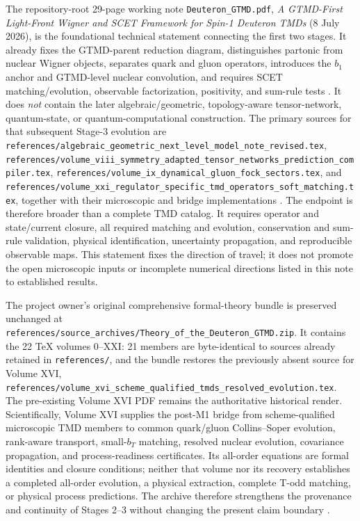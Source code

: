 \documentclass[11pt,oneside]{book}
\newcommand{\codepath}[1]{\nolinkurl{#1}}
\begin{document}
The repository-root 29-page working note \codepath{Deuteron_GTMD.pdf}, \emph{A GTMD-First Light-Front Wigner and SCET Framework for Spin-1 Deuteron TMDs} (8 July 2026), is the foundational technical statement connecting the first two stages.  It already fixes the GTMD-parent reduction diagram, distinguishes partonic from nuclear Wigner objects, separates quark and gluon operators, introduces the $b_1$ anchor and GTMD-level nuclear convolution, and requires SCET matching/evolution, observable factorization, positivity, and sum-rule tests \cite{DWGTMDTechnicalDraft2026}.  It does \emph{not} contain the later algebraic/geometric, topology-aware tensor-network, quantum-state, or quantum-computational construction.  The primary sources for that subsequent Stage-3 evolution are \codepath{references/algebraic_geometric_next_level_model_note_revised.tex}, \codepath{references/volume_viii_symmetry_adapted_tensor_networks_prediction_compiler.tex}, \codepath{references/volume_ix_dynamical_gluon_fock_sectors.tex}, and \codepath{references/volume_xxi_regulator_specific_tmd_operators_soft_matching.tex}, together with their microscopic and bridge implementations \cite{DWFormalVolumes2026}.  The endpoint is therefore broader than a complete TMD catalog.  It requires operator and state/current closure, all required matching and evolution, conservation and sum-rule validation, physical identification, uncertainty propagation, and reproducible observable maps.  This statement fixes the direction of travel; it does not promote the open microscopic inputs or incomplete numerical directions listed in this note to established results.

The project owner's original comprehensive formal-theory bundle is preserved unchanged at \codepath{references/source_archives/Theory_of_the_Deuteron_GTMD.zip}.  It contains the 22 TeX volumes 0--XXI: 21 members are byte-identical to sources already retained in \codepath{references/}, and the bundle restores the previously absent source for Volume XVI, \codepath{references/volume_xvi_scheme_qualified_tmds_resolved_evolution.tex}.  The pre-existing Volume XVI PDF remains the authoritative historical render.  Scientifically, Volume XVI supplies the post-M1 bridge from scheme-qualified microscopic TMD members to common quark/gluon Collins--Soper evolution, rank-aware transport, small-$b_T$ matching, resolved nuclear evolution, covariance propagation, and process-readiness certificates.  Its all-order equations are formal identities and closure conditions; neither that volume nor its recovery establishes a completed all-order evolution, a physical extraction, complete T-odd matching, or physical process predictions.  The archive therefore strengthens the provenance and continuity of Stages 2--3 without changing the present claim boundary \cite{DWFormalVolumes2026}.
\end{document}
